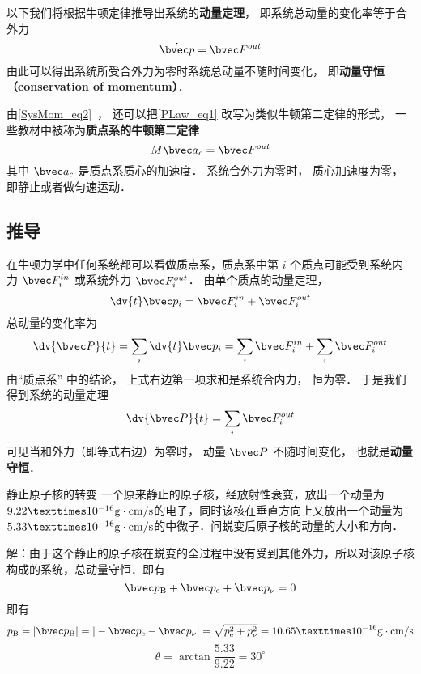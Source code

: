 
以下我们将根据牛顿定律推导出系统的\textbf{动量定理}， 即系统总动量的变化率等于合外力
\begin{equation}\label{PLaw_eq1}
\dot {\bvec p} = \bvec F^{out}
\end{equation}
由此可以得出系统所受合外力为零时系统总动量不随时间变化， 即\textbf{动量守恒（conservation of momentum）}．

由\autoref{SysMom_eq2}~， 还可以把\autoref{PLaw_eq1} 改写为类似牛顿第二定律的形式， 一些教材中被称为\textbf{质点系的牛顿第二定律}
\begin{equation}
M \bvec a_c = \bvec F^{out}
\end{equation}
其中 $\bvec a_c$ 是质点系质心的加速度． 系统合外力为零时， 质心加速度为零， 即静止或者做匀速运动．

\subsection{推导}
在牛顿力学中任何系统都可以看做质点系，质点系中第 $i$ 个质点可能受到系统内力 $\bvec F_i^{in}$ 或系统外力 $\bvec F_i^{out}$． 由单个质点的动量定理，
\begin{equation}
\dv{t} \bvec p_i = \bvec F_i^{in} + \bvec F_i^{out}
\end{equation}
总动量的变化率为
\begin{equation}
\dv{\bvec P}{t} = \sum_i \dv{t} \bvec p_i  = \sum_i \bvec F_i^{in}  + \sum_i \bvec F_i^{out}
\end{equation}
由“质点系” 中的结论， 上式右边第一项求和是系统合内力， 恒为零． 于是我们得到系统的动量定理
\begin{equation}
\dv{\bvec P}{t} = \sum_i \bvec F_i^{out}
\end{equation}
可见当和外力（即等式右边）为零时， 动量 $\bvec P$ 不随时间变化， 也就是\textbf{动量守恒}．

\begin{example}{静止原子核的转变}
一个原来静止的原子核，经放射性衰变，放出一个动量为$9.22×10^{-16}{\rm g\cdot cm/s}$的电子，同时该核在垂直方向上又放出一个动量为$5.33×10^{-16}{\rm g\cdot cm/s}$的中微子．问蜕变后原子核的动量的大小和方向．

解：由于这个静止的原子核在蜕变的全过程中没有受到其他外力，所以对该原子核构成的系统，总动量守恒．即有
\begin{equation}
\bvec p_{\rm B}+\bvec p_{\rm e}+\bvec p_{\rm \nu}=0
\end{equation}
即有
\begin{equation}
p_{\rm B}=|\bvec p_{\rm B}|=|-\bvec p_{\rm e}-\bvec p_{\rm \nu}|=\sqrt{p_{\rm e}^{2}+p_{\rm \nu}^{2}}=10.65×10^{-16}{\rm g\cdot cm/s}
\end{equation}
\begin{equation}
\theta=\arctan\frac{5.33}{9.22}=30^\circ
\end{equation}
\end{example}

